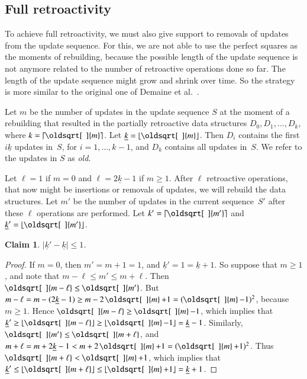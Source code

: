 \documentclass[3p,times,procedia]{elsarticle}
\DeclarePairedDelimiter\ceil{\lceil}{\rceil}
\DeclarePairedDelimiter\floor{\lfloor}{\rfloor}
\renewcommand{\sqrt}[2][\mkern8mu]{\mkern-1mu\mathop{\oldsqrt[#1]{#2}}}
\newtheorem{claim}	[theorem] {Claim}
\begin{document}
\subsection{Full retroactivity}\label{subsec:fully}

To achieve full retroactivity, 
we must also give support to removals of updates from the update sequence.  
For this, we are not able to use the perfect squares as the moments 
of rebuilding, because the possible length of the update sequence is
not anymore related to the number of retroactive operations done so far. 
The length of the update sequence might grow and shrink over time. 
So the strategy is more similar to the original one of Demaine et al.~\cite{DemaineIL2007}. 

Let $m$ be the number of updates in the update sequence $S$ at the
moment of a rebuilding that resulted in the partially retroactive 
data structures $D_0,D_1,\ldots,D_k$, where $k=\ceil{\sqrt{m}}$.
Let $\underline{k} = \floor{\sqrt{m}}$.
Then $D_i$ contains the first $i\underline{k}$ updates in~$S$, 
for $i=1,\ldots,k-1$, and $D_k$ contains all updates in~$S$. 
We refer to the updates in $S$ as \emph{old}.

Let $\ell=1$ if $m = 0$ and $\ell=2\underline{k}-1$ if $m \geq 1$. 
After $\ell$ retroactive operations, that now might be insertions 
or removals of updates, we will rebuild the data structures.
Let $m'$ be the number of updates in the current sequence~$S'$ 
after these $\ell$ operations are performed. 
Let $k'= \ceil{\sqrt{m'}}$ and $\underline{k}' = \floor{\sqrt{m'}}$. 

\begin{claim}
  $|\underline{k}' - \underline{k}| \leq 1$.
\end{claim}
\begin{proof}
  If $m = 0$, then $m' = m + 1 = 1$, and $\underline{k}' = 1 = \underline{k}+1$.
  So suppose that $m \geq 1$, and note that $m-\ell \leq m' \leq m+\ell$.  
  Then $\sqrt{m-\ell} \leq \sqrt{m'}$.  
  But $m-\ell = m - (2\underline{k}-1) \geq m - 2\sqrt{m} + 1 = (\sqrt{m}-1)^2$, 
  because $m \geq 1$. 
  Hence $\sqrt{m-\ell} \geq \sqrt{m}-1$, 
  which implies that 
  $\underline{k}' \geq \floor{\sqrt{m-\ell}} \geq \floor{\sqrt{m}-1} = \underline{k}-1$. 
  Similarly, $\sqrt{m'} \leq \sqrt{m+\ell}$, and
  $m+\ell = m + 2\underline{k}-1 < m + 2\sqrt{m} + 1 = (\sqrt{m}+1)^2$. 
  Thus $\sqrt{m+\ell} < \sqrt{m}+1$, 
  which implies that 
  $\underline{k}' \leq \floor{\sqrt{m+\ell}} \leq \floor{\sqrt{m}+1} = \underline{k}+1$.
\end{proof}
\end{document}
